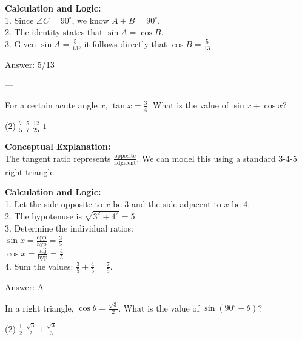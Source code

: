 \documentclass[11pt,paper=a4,answers]{exam}
\begin{document}
\begin{questions}
\begin{solution}
\vspace{10pt}
\textbf{Calculation and Logic:} \\
1. Since $\angle C = 90^\circ$, we know $A + B = 90^\circ$. \\
2. The identity states that $\sin A = \cos B$. \\
3. Given $\sin A = \frac{5}{13}$, it follows directly that $\cos B = \frac{5}{13}$.

\vspace{15pt}
Answer: \colorbox{yellow!100}{5/13}
\end{solution}

---

\question
For a certain acute angle $x$, $\tan x = \frac{3}{4}$. What is the value of $\sin x + \cos x$?
\begin{tasks}(2)
    \task $\frac{7}{5}$
    \task $\frac{5}{7}$
    \task $\frac{12}{25}$
    \task $1$
\end{tasks}

\begin{solution}
\textbf{Conceptual Explanation:} \\
The tangent ratio represents $\frac{\text{opposite}}{\text{adjacent}}$. We can model this using a standard 3-4-5 right triangle.

\vspace{10pt}
\textbf{Calculation and Logic:} \\
1. Let the side opposite to $x$ be 3 and the side adjacent to $x$ be 4. \\
2. The hypotenuse is $\sqrt{3^2 + 4^2} = 5$. \\
3. Determine the individual ratios: \\
   $\sin x = \frac{\text{opp}}{\text{hyp}} = \frac{3}{5}$ \\
   $\cos x = \frac{\text{adj}}{\text{hyp}} = \frac{4}{5}$ \\
4. Sum the values: $\frac{3}{5} + \frac{4}{5} = \frac{7}{5}$.

\vspace{15pt}
Answer: \colorbox{yellow!100}{A}
\end{solution}


\question
In a right triangle, $\cos \theta = \frac{\sqrt{3}}{2}$. What is the value of $\sin (90^\circ - \theta)$?
\begin{tasks}(2)
    \task $\frac{1}{2}$
    \task $\frac{\sqrt{3}}{2}$
    \task $1$
    \task $\frac{\sqrt{3}}{3}$
\end{tasks}


\end{questions}
\end{document}
